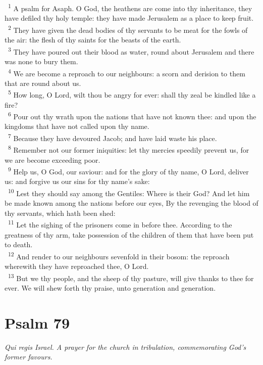 \documentclass[a5paper,12pt]{article}
\begin{document}
\begin{multicols*}{2}
~\textsuperscript{1} A psalm for Asaph. O God, the heathens are come into thy inheritance, they have defiled thy holy temple: they have made Jerusalem as a place to keep fruit.\\
~\textsuperscript{2} They have given the dead bodies of thy servants to be meat for the fowls of the air: the flesh of thy saints for the beasts of the earth.\\
~\textsuperscript{3} They have poured out their blood as water, round about Jerusalem and there was none to bury them.\\
~\textsuperscript{4} We are become a reproach to our neighbours: a scorn and derision to them that are round about us.\\
~\textsuperscript{5} How long, O Lord, wilt thou be angry for ever: shall thy zeal be kindled like a fire?\\
~\textsuperscript{6} Pour out thy wrath upon the nations that have not known thee: and upon the kingdoms that have not called upon thy name.\\
~\textsuperscript{7} Because they have devoured Jacob; and have laid waste his place.\\
~\textsuperscript{8} Remember not our former iniquities: let thy mercies speedily prevent us, for we are become exceeding poor.\\
~\textsuperscript{9} Help us, O God, our saviour: and for the glory of thy name, O Lord, deliver us: and forgive us our sins for thy name's sake:\\
~\textsuperscript{10} Lest they should say among the Gentiles: Where is their God? And let him be made known among the nations before our eyes, By the revenging the blood of thy servants, which hath been shed:\\
~\textsuperscript{11} Let the sighing of the prisoners come in before thee. According to the greatness of thy arm, take possession of the children of them that have been put to death.\\
~\textsuperscript{12} And render to our neighbours sevenfold in their bosom: the reproach wherewith they have reproached thee, O Lord.\\
~\textsuperscript{13} But we thy people, and the sheep of thy pasture, will give thanks to thee for ever. We will shew forth thy praise, unto generation and generation.\\

\section{Psalm 79}
\label{sec:orgbe8103a}
\emph{Qui regis Israel. A prayer for the church in tribulation, commemorating God's former favours.}\\


\end{multicols*}
\end{document}
